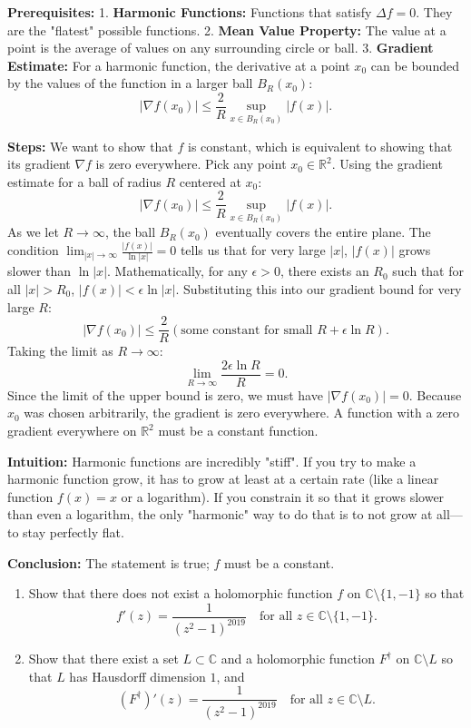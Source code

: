\begin{solution}
\textbf{Prerequisites:}
1. \textbf{Harmonic Functions:} Functions that satisfy $\Delta f = 0$. They are the "flatest" possible functions.
2. \textbf{Mean Value Property:} The value at a point is the average of values on any surrounding circle or ball.
3. \textbf{Gradient Estimate:} For a harmonic function, the derivative at a point $x_0$ can be bounded by the values of the function in a larger ball $B_R(x_0)$:
\[
|\nabla f(x_0)| \leq \frac{2}{R} \sup_{x \in B_R(x_0)} |f(x)|.
\]

\textbf{Steps:}
We want to show that $f$ is constant, which is equivalent to showing that its gradient $\nabla f$ is zero everywhere. Pick any point $x_0 \in \mathbb{R}^2$. Using the gradient estimate for a ball of radius $R$ centered at $x_0$:
\[
|\nabla f(x_0)| \leq \frac{2}{R} \sup_{x \in B_R(x_0)} |f(x)|.
\]
As we let $R \to \infty$, the ball $B_R(x_0)$ eventually covers the entire plane. The condition $\lim_{|x|\to\infty} \frac{|f(x)|}{\ln |x|} = 0$ tells us that for very large $|x|$, $|f(x)|$ grows slower than $\ln |x|$.
Mathematically, for any $\epsilon > 0$, there exists an $R_0$ such that for all $|x| > R_0$, $|f(x)| < \epsilon \ln |x|$.
Substituting this into our gradient bound for very large $R$:
\[
|\nabla f(x_0)| \leq \frac{2}{R} (\text{some constant for small } R + \epsilon \ln R).
\]
Taking the limit as $R \to \infty$:
\[
\lim_{R\to\infty} \frac{2 \epsilon \ln R}{R} = 0.
\]
Since the limit of the upper bound is zero, we must have $|\nabla f(x_0)| = 0$. Because $x_0$ was chosen arbitrarily, the gradient is zero everywhere. A function with a zero gradient everywhere on $\mathbb{R}^2$ must be a constant function.

\textbf{Intuition:}
Harmonic functions are incredibly "stiff". If you try to make a harmonic function grow, it has to grow at least at a certain rate (like a linear function $f(x)=x$ or a logarithm). If you constrain it so that it grows slower than even a logarithm, the only "harmonic" way to do that is to not grow at all—to stay perfectly flat.

\textbf{Conclusion:}
The statement is true; $f$ must be a constant.
\end{solution}

\begin{exercise}
\label{analysis:2019:4}
\begin{enumerate}
    \item Show that there does not exist a holomorphic function $f$ on $\mathbb{C}\setminus\{1,-1\}$ so that
    \[
    f'(z) = \frac{1}{(z^2-1)^{2019}} \quad \text{for all } z\in\mathbb{C}\setminus\{1,-1\}.
    \]

    \item Show that there exist a set $L\subset\mathbb{C}$ and a holomorphic function $F^{\dagger}$ on $\mathbb{C}\setminus L$ so that $L$ has Hausdorff dimension $1$, and
    \[
    (F^{\dagger})'(z) = \frac{1}{(z^2-1)^{2019}} \quad \text{for all } z\in\mathbb{C}\setminus L.
    \]
\end{enumerate}
\end{exercise}

